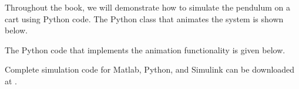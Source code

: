 Throughout the book, we will demonstrate how to simulate the pendulum on a cart using Python code.  The Python class that animates the system is shown below.


The Python code that implements the animation functionality is given below.


Complete simulation code for Matlab, Python, and Simulink can be downloaded at .






